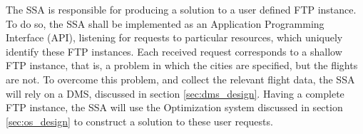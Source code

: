 The SSA is responsible for producing a solution to a user defined FTP instance. To do so, the SSA shall be implemented as an Application Programming Interface (API), listening for requests to particular resources, which uniquely identify these FTP instances. Each received request corresponds to a shallow FTP instance, that is, a problem in which the cities are specified, but the flights are not. To overcome this problem, and collect the relevant flight data, the SSA will rely on a \ac{DMS}, discussed in section \ref{sec:dms_design}. Having a complete FTP instance, the SSA will use the Optimization system discussed in section \ref{sec:os_design} to construct a solution to these user requests.


